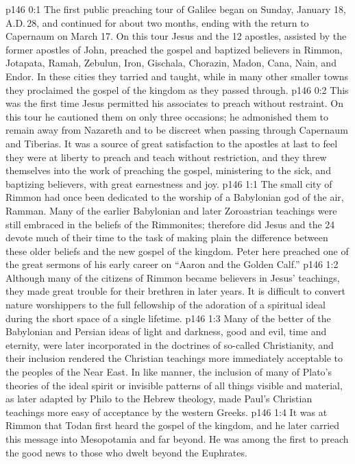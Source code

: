 \author{Midwayer Commission}
\vs p146 0:1 The first public preaching tour of Galilee began on Sunday, January 18, A.D.\,28, and continued for about two months, ending with the return to Capernaum on March 17. On this tour Jesus and the 12 apostles, assisted by the former apostles of John, preached the gospel and baptized believers in Rimmon, Jotapata, Ramah, Zebulun, Iron, Gischala, Chorazin, Madon, Cana, Nain, and Endor. In these cities they tarried and taught, while in many other smaller towns they proclaimed the gospel of the kingdom as they passed through.
\vs p146 0:2 This was the first time Jesus permitted his associates to preach without restraint. On this tour he cautioned them on only three occasions; he admonished them to remain away from Nazareth and to be discreet when passing through Capernaum and Tiberias. It was a source of great satisfaction to the apostles at last to feel they were at liberty to preach and teach without restriction, and they threw themselves into the work of preaching the gospel, ministering to the sick, and baptizing believers, with great earnestness and joy.
\vs p146 1:1 The small city of Rimmon had once been dedicated to the worship of a Babylonian god of the air, Ramman. Many of the earlier Babylonian and later Zoroastrian teachings were still embraced in the beliefs of the Rimmonites; therefore did Jesus and the 24 devote much of their time to the task of making plain the difference between these older beliefs and the new gospel of the kingdom. Peter here preached one of the great sermons of his early career on “Aaron and the Golden Calf.”
\vs p146 1:2 Although many of the citizens of Rimmon became believers in Jesus’ teachings, they made great trouble for their brethren in later years. It is difficult to convert nature worshippers to the full fellowship of the adoration of a spiritual ideal during the short space of a single lifetime.
\vs p146 1:3 \pc Many of the better of the Babylonian and Persian ideas of light and darkness, good and evil, time and eternity, were later incorporated in the doctrines of so\hyp{}called Christianity, and their inclusion rendered the Christian teachings more immediately acceptable to the peoples of the Near East. In like manner, the inclusion of many of Plato’s theories of the ideal spirit or invisible patterns of all things visible and material, as later adapted by Philo to the Hebrew theology, made Paul’s Christian teachings more easy of acceptance by the western Greeks.
\vs p146 1:4 \pc It was at Rimmon that Todan first heard the gospel of the kingdom, and he later carried this message into Mesopotamia and far beyond. He was among the first to preach the good news to those who dwelt beyond the Euphrates.
